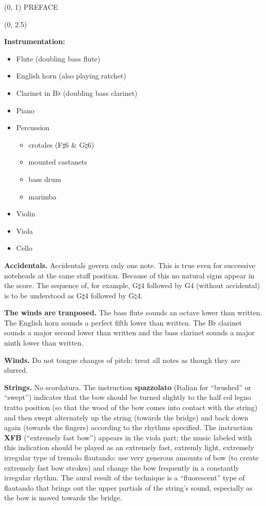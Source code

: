 \documentclass[10pt]{article}
\begin{document}
\begin{textblock}{23}(0, 1)
\center \huge PREFACE
\end{textblock}

\begin{textblock}{23}(0, 2.5)


\textbf{Instrumentation:}

\begin{itemize} \itemsep2pt
\item Flute (doubling bass flute)
\item English horn (also playing ratchet)
\item Clarinet in B$\flat$ (doubling bass clarinet)
\item Piano
\item Percussion
    \begin{itemize}
    \item crotales (F$\sharp$6 \& G$\natural$6)
    \item mounted castanets
    \item bass drum
    \item marimba
    \end{itemize}
\item Violin
\item Viola
\item Cello
\end{itemize}

\textbf{Accidentals.} Accidentals govern only one note. This is true even for
successive noteheads at the same staff position. Because of this no natural
signs appear in the score. The sequence of, for example, G$\sharp$4 followed by
G4 (without accidental) is to be understood as G$\sharp$4 followed by
G$\natural$4.

\textbf{The winds are tranposed.} The bass flute sounds an octave lower than
written. The English horn sounds a perfect fifth lower than written. The
B$\flat$ clarinet sounds a major second lower than written and the bass
clarinet sounds a major ninth lower than written.

\textbf{Winds.} Do not tongue changes of pitch: treat all notes as though they
are slurred. 

\textbf{Strings.} No scordatura. The instruction \textbf{spazzolato} (Italian
for ``brushed'' or ``swept'') indicates that the bow should be turned slightly
to the half col legno tratto position (so that the wood of the bow comes into
contact with the string) and then swept alternately up the string (towards the
bridge) and back down again (towards the fingers) according to the rhythms
specified. The instruction \textbf{XFB} (``extremely fast bow'') appears in the
viola part; the music labeled with this indication should be played as an
extremely fast, extremly light, extremely irregular type of tremolo flautando:
use very generous amounts of bow (to create extremely fast bow strokes) and
change the bow frequently in a constantly irregular rhythm. The aural result of
the technique is a ``fluorescent'' type of flautando that brings out the upper
partials of the string's sound, especially as the bow is moved towards the
bridge.


\end{textblock}
\end{document}
